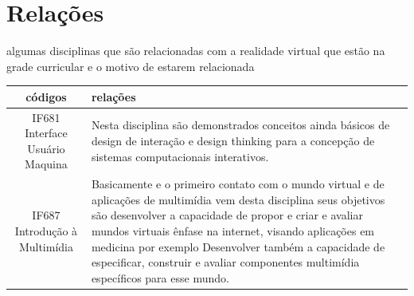 \documentclass[10pt]{article}
\begin{document}
\section{Relações}


algumas disciplinas que são relacionadas com a realidade virtual que estão na grade curricular e o motivo de estarem relacionada
\begin{center}
\begin{tabular}{|c|p{10cm}|}
\hline
códigos & relações \\ \hline
 IF681 Interface Usuário Maquina &
 Nesta disciplina são demonstrados conceitos ainda básicos de design de interação e design thinking para a concepção de sistemas computacionais interativos.\cite{terceira}
 \\ \hline
 IF687 Introdução à Multimídia  & 
Basicamente e o primeiro contato com o mundo virtual e de aplicações de multimídia vem desta disciplina seus objetivos são desenvolver a capacidade de propor e criar e avaliar mundos virtuais ênfase na internet, visando aplicações em medicina por exemplo
Desenvolver também a capacidade de especificar, construir e avaliar componentes multimídia específicos para esse mundo. \cite{quarta} \\ \hline

\end{tabular}    
\end{center}




\end{document}
